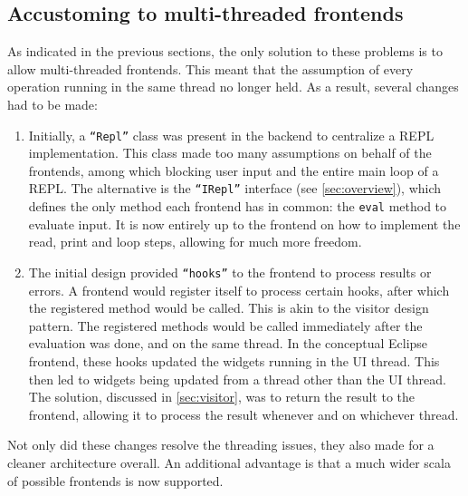 \subsection{Accustoming to multi-threaded frontends}

As indicated in the previous sections, the only solution to these problems is to
allow multi-threaded frontends. This meant that the assumption of every
operation running in the same thread no longer held. As a result, several
changes had to be made:

\begin{enumerate}
  \item Initially, a \texttt{``Repl''} class was present in the backend to
  centralize a REPL implementation. This class made too many assumptions on
  behalf of the frontends, among which blocking user input and the entire main
  loop of a REPL. The alternative is the \texttt{``IRepl''} interface (see
  \cref{sec:overview}), which defines the only method each frontend has in
  common: the \texttt{eval} method to evaluate input. It is now entirely up to
  the frontend on how to implement the read, print and loop steps, allowing for
  much more freedom.
  \item The initial design provided \texttt{``hooks''} to the frontend to process
  results or errors. A frontend would register itself to process certain hooks,
  after which the registered method would be called. This is akin to the visitor
  design pattern. The registered methods would be called immediately after the
  evaluation was done, and on the same thread. In the conceptual Eclipse
  frontend, these hooks updated the widgets running in the UI thread. This then
  led to widgets being updated from a thread other than the UI thread.
  The solution, discussed in \cref{sec:visitor}, was to return the result to the
  frontend, allowing it to process the result whenever and on whichever thread.
\end{enumerate}

Not only did these changes resolve the threading issues, they also made for a
cleaner architecture overall. An additional advantage is that a much wider scala
of possible frontends is now supported.


